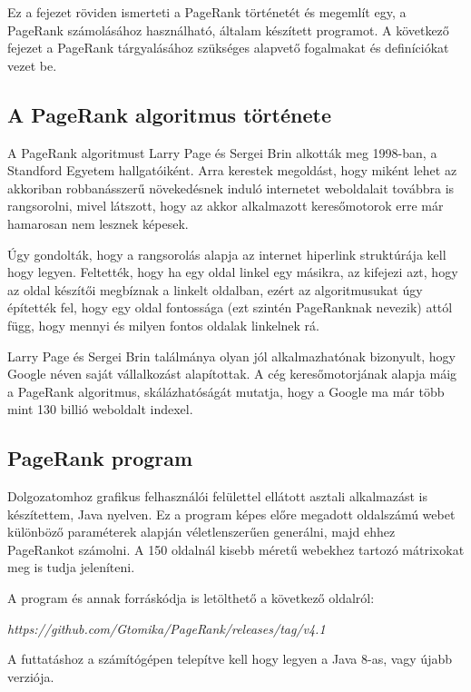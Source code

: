 \documentclass[12pt,a4paper]{article}
\begin{document}
Ez a fejezet röviden ismerteti a PageRank történetét és megemlít egy, a PageRank számolásához használható, általam készített programot. A következő fejezet a PageRank tárgyalásához szükséges alapvető fogalmakat és definíciókat vezet be. 

\subsection{A PageRank algoritmus története}

A PageRank algoritmust Larry Page és Sergei Brin alkották meg 1998-ban, a Standford Egyetem hallgatóiként. Arra kerestek megoldást, hogy miként lehet az akkoriban robbanásszerű növekedésnek induló internetet weboldalait továbbra is rangsorolni, mivel látszott, hogy az akkor alkalmazott keresőmotorok erre már hamarosan nem lesznek képesek.

Úgy gondolták, hogy a rangsorolás alapja az internet hiperlink struktúrája kell hogy legyen. Feltették, hogy ha egy oldal linkel egy másikra, az kifejezi azt, hogy az oldal készítői megbíznak a linkelt oldalban, ezért az algoritmusukat úgy építették fel, hogy egy oldal fontossága (ezt szintén PageRanknak nevezik) attól függ, hogy mennyi és milyen fontos oldalak linkelnek rá.

Larry Page és Sergei Brin találmánya olyan jól alkalmazhatónak bizonyult, hogy Google néven saját vállalkozást alapítottak. A cég keresőmotorjának alapja máig a PageRank algoritmus, skálázhatóságát mutatja, hogy a Google ma már több mint 130 billió weboldalt indexel. 

\subsection{PageRank program}\label{program}

Dolgozatomhoz grafikus felhasználói felülettel ellátott asztali alkalmazást is készítettem, Java nyelven. Ez a program képes előre megadott oldalszámú webet különböző paraméterek alapján véletlenszerűen generálni, majd ehhez PageRankot számolni. A 150 oldalnál kisebb méretű webekhez tartozó mátrixokat meg is tudja jeleníteni.

A program és annak forráskódja is letölthető a következő oldalról:

\vspace{0.3 cm}
\textit{https://github.com/Gtomika/PageRank/releases/tag/v4.1}
\vspace{0.3 cm}

 A futtatáshoz a számítógépen telepítve kell hogy legyen a Java 8-as, vagy újabb verziója.
\end{document}

